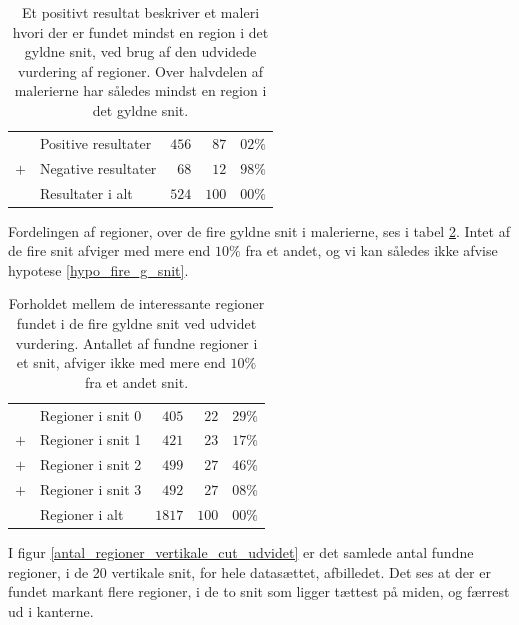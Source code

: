 {\begin{table}[H]
    \centering
    \begin{tabular}{r@{\ \ }p{12em}r|r@{.}l}
            & Positive resultater   & $456$ &  $87$ & $02\%$ \\
        $+$ & Negative resultater   &  $68$ &  $12$ & $98\%$ \\\hline
            & Resultater i alt      & $524$ & $100$ & $00\%$
    \end{tabular}
    \caption[]{Et positivt resultat beskriver et maleri hvori der er
    fundet mindst en region i det gyldne snit, ved brug af den udvidede
    vurdering af regioner. Over halvdelen af malerierne har således
    mindst en region i det gyldne snit.}
    \label{ud_tabel_fordeling}
\end{table}

Fordelingen af regioner, over de fire gyldne snit i malerierne, ses i
tabel \ref{ud_tabel_fire_snit}. Intet af de fire snit afviger med
mere end $10\%$ fra et andet, og vi kan således ikke afvise hypotese
\ref{hypo_fire_g_snit}.

\begin{table}[H]
    \centering
    \begin{tabular}{r@{\ \ }p{12em}r|r@{.}l}
            & Regioner i snit 0   &  $405$ &  $22$ & $29\%$ \\
        $+$ & Regioner i snit 1   &  $421$ &  $23$ & $17\%$ \\
        $+$ & Regioner i snit 2   &  $499$ &  $27$ & $46\%$ \\
        $+$ & Regioner i snit 3   &  $492$ &  $27$ & $08\%$ \\\hline
            & Regioner i alt      & $1817$ & $100$ & $00\%$
    \end{tabular}
    \caption[]{Forholdet mellem de interessante regioner fundet i de
    fire gyldne snit ved udvidet vurdering. Antallet af fundne regioner
    i et snit, afviger ikke med mere end $10\%$ fra et andet snit.}
    \label{ud_tabel_fire_snit}
\end{table}


I figur \ref{antal_regioner_vertikale_cut_udvidet} er det samlede antal
fundne regioner, i de 20 vertikale snit, for hele datasættet,
afbilledet. Det ses at der er fundet markant flere regioner, i de to snit som
ligger tættest på miden, og færrest ud i kanterne.

}
